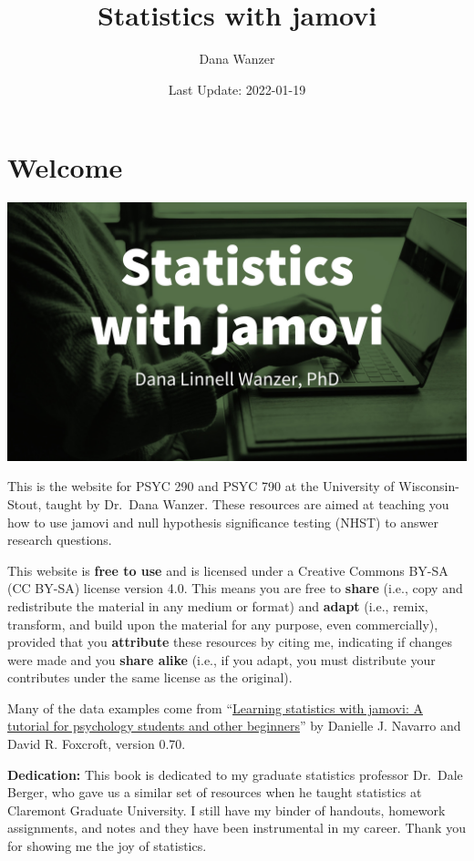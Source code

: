 \documentclass[
]{book}
\title{Statistics with jamovi}
\author{Dana Wanzer}
\date{Last Update: 2022-01-19}
\begin{document}
\maketitle

{
\setcounter{tocdepth}{1}
\tableofcontents
}
\hypertarget{welcome}{%
\chapter*{Welcome}\label{welcome}}

\includegraphics{images/Cover.jpg}

This is the website for PSYC 290 and PSYC 790 at the University of Wisconsin-Stout, taught by Dr.~Dana Wanzer. These resources are aimed at teaching you how to use jamovi and null hypothesis significance testing (NHST) to answer research questions.

This website is \textbf{free to use} and is licensed under a Creative Commons BY-SA (CC BY-SA) license version 4.0. This means you are free to \textbf{share} (i.e., copy and redistribute the material in any medium or format) and \textbf{adapt} (i.e., remix, transform, and build upon the material for any purpose, even commercially), provided that you \textbf{attribute} these resources by citing me, indicating if changes were made and you \textbf{share alike} (i.e., if you adapt, you must distribute your contributes under the same license as the original).

Many of the data examples come from ``\href{http://www.learnstatswithjamovi.com}{Learning statistics with jamovi: A tutorial for psychology students and other beginners}'' by Danielle J. Navarro and David R. Foxcroft, version 0.70.

\textbf{Dedication:} This book is dedicated to my graduate statistics professor Dr.~Dale Berger, who gave us a similar set of resources when he taught statistics at Claremont Graduate University. I still have my binder of handouts, homework assignments, and notes and they have been instrumental in my career. Thank you for showing me the joy of statistics.
\end{document}
